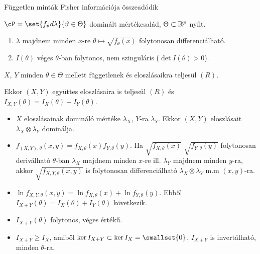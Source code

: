 \documentclass[aspectratio=169,notheorems,9pt,\option]{beamer}
\begin{document}
\begin{frame}{Független minták Fisher információja összeadódik}
  \begin{df}
    $\cP=\set{f_\theta d\lambda}{\theta\in\Theta}$ dominált mértékcsalád, $\Theta\subset\mathbb{R}^p$ nyílt.
    \begin{enumerate}[<*>]
      \item $\lambda$ majdnem minden $x$-re $\theta\mapsto \sqrt{f_\theta(x)}$ folytonosan differenciálható.
      \item $I(\theta)$ véges $\theta$-ban folytonos, nem szinguláris ($\det I(\theta)>0$).
    \end{enumerate}
  \end{df}
  \begin{proposition}
    $X$, $Y$ minden $\theta\in\Theta$ mellett függetlenek és eloszlásaikra teljesül $(R)$.

    Ekkor $(X,Y)$ együttes eloszlásaira is teljesül $(R)$ és $I_{X,Y}(\theta)=I_{X}(\theta)+I_{Y}(\theta)$.
  \end{proposition}
  \begin{itemize}
    \item $X$ eloszlásainak domináló mértéke $\lambda_X$, $Y$-ra $\lambda_Y$. Ekkor $(X,Y)$ eloszlásait 
    $\lambda_X\otimes\lambda_Y$ dominálja. 
    \item $f_{(X,Y),\theta}(x,y)=f_{X,\theta}(x)f_{Y,\theta}(y)$. Ha $\sqrt{f_{X,\theta}(x)}$ $\sqrt{f_{Y,\theta}(y)}$ 
    folytonosan deriválható $\theta$-ban $\lambda_X$ majdnem minden $x$-re ill. $\lambda_Y$ majdnem minden $y$-ra, akkor 
    $\sqrt{f_{X,Y,\theta}(x,y)}$ is folytonosan differenciálható $\lambda_X\otimes\lambda_Y$ m.m $(x,y)$-ra. 
    \item $\ln f_{X,Y,\theta}(x,y)=\ln f_{X,\theta}(x)+\ln f_{Y,\theta}(y)$. 
    Ebből $I_{X+Y}(\theta)=I_X(\theta)+I_{Y}(\theta)$ következik. 
    \item $I_{X+Y}(\theta)$ folytonos, véges értékű.
    \item $I_{X+Y}\geq I_{X}$, amiből $\ker I_{X+Y}\subset \ker I_X=\smallset{0}$, 
    $I_{X+Y}$ is invertálható, minden $\theta$-ra.
  \end{itemize}
\end{frame}
\end{document}
